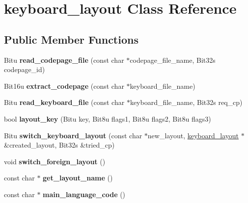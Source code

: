 \hypertarget{classkeyboard__layout}{\section{keyboard\-\_\-layout Class Reference}
\label{classkeyboard__layout}
}
\subsection*{Public Member Functions}
\begin{DoxyCompactItemize}
\item 
\hypertarget{classkeyboard__layout_a1ef168e080ac2809f4518b450de3cfd0}{Bitu {\bfseries read\-\_\-codepage\-\_\-file} (const char $\ast$codepage\-\_\-file\-\_\-name, Bit32s codepage\-\_\-id)}\label{classkeyboard__layout_a1ef168e080ac2809f4518b450de3cfd0}

\item 
\hypertarget{classkeyboard__layout_a66d367d813246bdf3452698ab01e17a8}{Bit16u {\bfseries extract\-\_\-codepage} (const char $\ast$keyboard\-\_\-file\-\_\-name)}\label{classkeyboard__layout_a66d367d813246bdf3452698ab01e17a8}

\item 
\hypertarget{classkeyboard__layout_a138c8e70f685bbdcd50d144a639a76e4}{Bitu {\bfseries read\-\_\-keyboard\-\_\-file} (const char $\ast$keyboard\-\_\-file\-\_\-name, Bit32s req\-\_\-cp)}\label{classkeyboard__layout_a138c8e70f685bbdcd50d144a639a76e4}

\item 
\hypertarget{classkeyboard__layout_a818cfe1c3b3f466ff58f90e8cff73727}{bool {\bfseries layout\-\_\-key} (Bitu key, Bit8u flags1, Bit8u flags2, Bit8u flags3)}\label{classkeyboard__layout_a818cfe1c3b3f466ff58f90e8cff73727}

\item 
\hypertarget{classkeyboard__layout_a4fdfc083c4f6fd545916cce8ccb5272b}{Bitu {\bfseries switch\-\_\-keyboard\-\_\-layout} (const char $\ast$new\-\_\-layout, \hyperlink{classkeyboard__layout}{keyboard\-\_\-layout} $\ast$\&created\-\_\-layout, Bit32s \&tried\-\_\-cp)}\label{classkeyboard__layout_a4fdfc083c4f6fd545916cce8ccb5272b}

\item 
\hypertarget{classkeyboard__layout_ada8b99ec33ab6051ba3a77d1c06979e5}{void {\bfseries switch\-\_\-foreign\-\_\-layout} ()}\label{classkeyboard__layout_ada8b99ec33ab6051ba3a77d1c06979e5}

\item 
\hypertarget{classkeyboard__layout_a763933f10894bfe8f3d187195919737b}{const char $\ast$ {\bfseries get\-\_\-layout\-\_\-name} ()}\label{classkeyboard__layout_a763933f10894bfe8f3d187195919737b}

\item 
\hypertarget{classkeyboard__layout_a4db7a069a2128d504a4ca1412af53ed0}{const char $\ast$ {\bfseries main\-\_\-language\-\_\-code} ()}\label{classkeyboard__layout_a4db7a069a2128d504a4ca1412af53ed0}

\end{DoxyCompactItemize}


